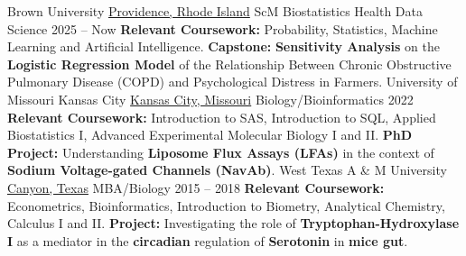 \documentclass[9pt]{adeckcv} %
\begin{document}


  

\begin{entrylist}
\entry
{\large{Brown University}} 
{\href{https://www.google.com/maps/search/?api=1\&query=41.8239593,-71.4068603}{Providence, Rhode Island}}
{ScM Biostatistics Health Data Science}
{2025 -- Now}
{\itemizeeducation
  {\textbf{Relevant Coursework:} Probability, Statistics, Machine Learning and Artificial Intelligence.}
  {\textbf{Capstone:} \textbf{Sensitivity Analysis} on the \textbf{Logistic Regression Model} of the Relationship Between Chronic Obstructive Pulmonary Disease (COPD) and Psychological Distress in Farmers.}
}
\entry
{\large{University of Missouri Kansas City}} 
{\href{https://www.google.com/maps/search/?api=1\&query=39.0349318,-94.5745504}{Kansas City, Missouri}}
{Biology/Bioinformatics}
{2022}
{\itemizeeducation
  {\textbf{Relevant Coursework:} Introduction to SAS, Introduction to SQL, Applied Biostatistics I, Advanced Experimental Molecular Biology I and II.}
  {\textbf{PhD Project:} Understanding \textbf{Liposome Flux Assays (LFAs)} in the context of \textbf{Sodium Voltage-gated Channels (NavAb)}.}
}
\entry
{\large{West Texas A \& M University}} 
{\href{https://www.google.com/maps/search/?api=1\&query=34.9828857,-101.9170101}{Canyon, Texas}}
{MBA/Biology}
{2015 -- 2018}
{\itemizeeducation
  {\textbf{Relevant Coursework:} Econometrics, Bioinformatics, Introduction to Biometry, Analytical Chemistry, Calculus I and II.}
  {\textbf{Project:} Investigating the role of \textbf{Tryptophan-Hydroxylase I} as a mediator in the \textbf{circadian} regulation of \textbf{Serotonin} in \textbf{mice gut}.}
}
\end{entrylist}

  
\end{document}
